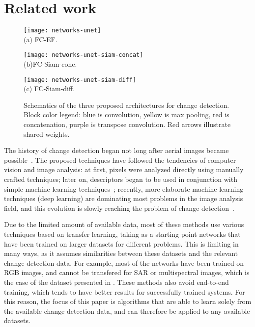 \documentclass{article}
\begin{document}
\section{Related work}
\label{sec:related}





\begin{figure*}
\begin{minipage}{0.19\linewidth}
\centering
\texttt{[image: networks-unet]}\\
(a) FC-EF.
\end{minipage}
\hfill
\begin{minipage}{0.39\linewidth}
\centering
\texttt{[image: networks-unet-siam-concat]}\\
(b)FC-Siam-conc.
\end{minipage}
\hfill
\begin{minipage}{0.40\linewidth}
\centering
\texttt{[image: networks-unet-siam-diff]}\\
(c) FC-Siam-diff.
\end{minipage}
\caption{Schematics of the three proposed architectures for change detection. Block color legend: blue is convolution, yellow is max pooling, red is concatenation, purple is transpose convolution. Red arrows illustrate shared weights.}
\label{fig:nets}
\end{figure*}

The history of change detection began not long after aerial images became possible~\cite{singh1989review,hussain2013change}. The proposed techniques have followed the tendencies of computer vision and image analysis: at first, pixels were analyzed directly using manually crafted techniques; later on, descriptors began to be used in conjunction with simple machine learning techniques~\cite{le2013urban}; recently, more elaborate machine learning techniques (deep learning) are dominating most problems in the image analysis field, and this evolution is slowly reaching the problem of change detection~\cite{stent2015detecting,liu2016deep,gong2016change,el2017zoom,zhan2017change,daudt2018urban,mou:hal-01561333}.

Due to the limited amount of available data, most of these methods use various techniques based on transfer learning, taking as a starting point networks that have been trained on larger datasets for different problems. This is limiting in many ways, as it assumes similarities between these datasets and the relevant change detection data. For example, most of the networks have been trained on RGB images, and cannot be transfered for SAR or multispectral images, which is the case of the dataset presented in \cite{daudt2018urban}. These methods also avoid end-to-end training, which tends to have better results for successfully trained systems. For this reason, the focus of this paper is algorithms that are able to learn solely from the available change detection data, and can therefore be applied to any available datasets.
\end{document}
